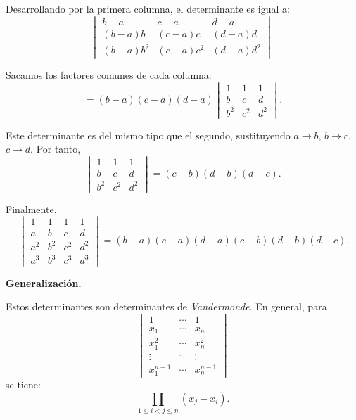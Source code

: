 \documentclass[a4paper,12pt]{article}
\begin{document}
\begin{ejercicio}[title=Ejercicio 34]
Desarrollando por la primera columna, el determinante es igual a:
\[
\begin{vmatrix}
b-a & c-a & d-a\\
(b-a)b & (c-a)c & (d-a)d\\
(b-a)b^2 & (c-a)c^2 & (d-a)d^2
\end{vmatrix}.
\]

Sacamos los factores comunes de cada columna:
\[
= (b-a)(c-a)(d-a)
\begin{vmatrix}
1 & 1 & 1\\
b & c & d\\
b^2 & c^2 & d^2
\end{vmatrix}.
\]

Este determinante es del mismo tipo que el segundo, sustituyendo
\(a\to b\), \(b\to c\), \(c\to d\). Por tanto,
\[
\begin{vmatrix}
1 & 1 & 1\\
b & c & d\\
b^2 & c^2 & d^2
\end{vmatrix}
= (c-b)(d-b)(d-c).
\]
\end{ejercicio}
\begin{ejercicio}[title=Ejercicio 34]
Finalmente,
\[
\boxed{\,\begin{vmatrix}
1 & 1 & 1 & 1\\
a & b & c & d\\
a^2 & b^2 & c^2 & d^2\\
a^3 & b^3 & c^3 & d^3
\end{vmatrix}
= (b-a)(c-a)(d-a)(c-b)(d-b)(d-c).}
\]

\textbf{Generalización.}

Estos determinantes son determinantes de \emph{Vandermonde}. En general, para
\[
\begin{vmatrix}
1 & \cdots & 1\\[4pt]
x_1 & \cdots & x_n\\[4pt]
x_1^2 & \cdots & x_n^2\\[4pt]
\vdots & \ddots & \vdots\\[4pt]
x_1^{n-1} & \cdots & x_n^{n-1}
\end{vmatrix}
\]
se tiene:
\[
\boxed{
\prod_{1\le i<j\le n}(x_j-x_i).
}
\]

\end{ejercicio}
\end{document}
